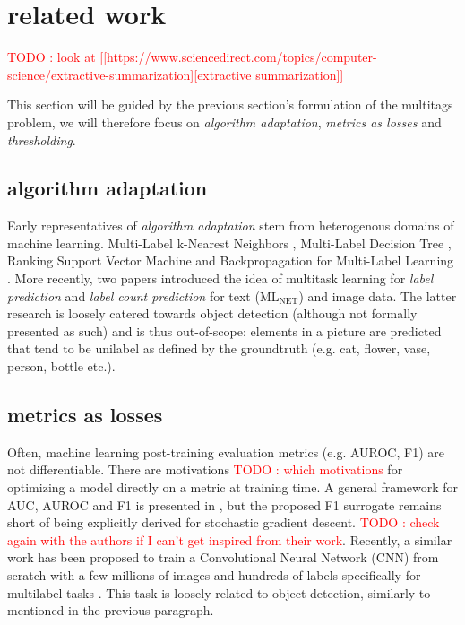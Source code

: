 \documentclass[sigconf,natbib,screen=true,review=true,anonymous]{acmart}
\newcommand\todo[1]{\textcolor{red}{TODO : #1}}
\begin{document}

\section{related work}
\label{sec:org2aceb9f}

\todo{look at [[https://www.sciencedirect.com/topics/computer-science/extractive-summarization][extractive summarization]]}

This section will be guided by the previous section's formulation of the multitags problem, we will therefore focus on \emph{algorithm adaptation}, \emph{metrics as losses} and \emph{thresholding}.

\subsection{algorithm adaptation}
\label{sec:org150a474}

Early representatives of \emph{algorithm adaptation} stem from heterogenous domains of machine learning. Multi-Label k-Nearest Neighbors \cite{ML-KNN}, Multi-Label Decision Tree \cite{ML-DT}, Ranking Support Vector Machine \cite{multilabelSVM} and Backpropagation for Multi-Label Learning \cite{multilabelBackprop}. More recently, two papers introduced the idea of multitask learning for \emph{label prediction} and \emph{label count prediction} for text (ML\(_{\text{NET}}\)) \cite{multitaskLabel} and image \cite{multitaskLabelImages} data. The latter research is loosely catered towards object detection (although not formally presented as such) and is thus out-of-scope: elements in a picture are predicted that tend to be unilabel as defined by the groundtruth (e.g. cat, flower, vase, person, bottle etc.).

\subsection{metrics as losses}
\label{sec:orgb0a9d21}

Often, machine learning post-training evaluation metrics (e.g. AUROC, F1) are not differentiable. There are motivations \todo{which motivations} for optimizing a model directly on a metric at training time. A general framework for AUC, AUROC and F1 is presented in \cite{optimizableLosses}, but the proposed F1 surrogate remains short of being explicitly derived for stochastic gradient descent. \todo{check again with the authors if I can't get inspired from their work}. Recently, a similar work has been proposed to train a Convolutional Neural Network (CNN) from scratch with a few millions of images and hundreds of labels specifically for multilabel tasks \cite{tencent}. This task is loosely related to object detection, similarly to \cite{multitaskLabelImages} mentioned in the previous paragraph.
\end{document}
